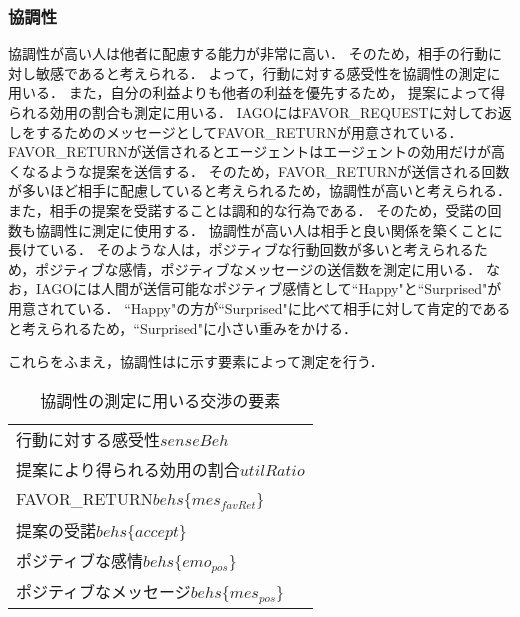\subsubsection{協調性}
協調性が高い人は他者に配慮する能力が非常に高い．
そのため，相手の行動に対し敏感であると考えられる．
よって，行動に対する感受性を協調性の測定に用いる．
また，自分の利益よりも他者の利益を優先するため，
提案によって得られる効用の割合も測定に用いる．
IAGOにはFAVOR\_REQUESTに対してお返しをするためのメッセージとしてFAVOR\_RETURNが用意されている．
FAVOR\_RETURNが送信されるとエージェントはエージェントの効用だけが高くなるような提案を送信する．
そのため，FAVOR\_RETURNが送信される回数が多いほど相手に配慮していると考えられるため，協調性が高いと考えられる．
また，相手の提案を受諾することは調和的な行為である．
そのため，受諾の回数も協調性に測定に使用する．
協調性が高い人は相手と良い関係を築くことに長けている．
そのような人は，ポジティブな行動回数が多いと考えられるため，ポジティブな感情，ポジティブなメッセージの送信数を測定に用いる．
なお，IAGOには人間が送信可能なポジティブ感情として``Happy"と``Surprised"が用意されている．
``Happy"の方が``Surprised"に比べて相手に対して肯定的であると考えられるため，``Surprised"に小さい重みをかける．

これらをふまえ，協調性はに示す要素によって測定を行う．

\begin{table}[b]
    \centering
    \caption{協調性の測定に用いる交渉の要素}
    \begin{tabular}{l} \toprule
        行動に対する感受性$senseBeh$ \\
        提案により得られる効用の割合$utilRatio$  \\
        FAVOR\_RETURN$behs\{mes_{\mathit{favRet}}\}$ \\
        提案の受諾$behs\{accept\}$ \\ 
        ポジティブな感情$behs\{emo_{pos}\}$ \\
        ポジティブなメッセージ$behs\{mes_{pos}\}$ \\ \bottomrule
    \end{tabular}
    \label{tab:agreeableness}
\end{table}

